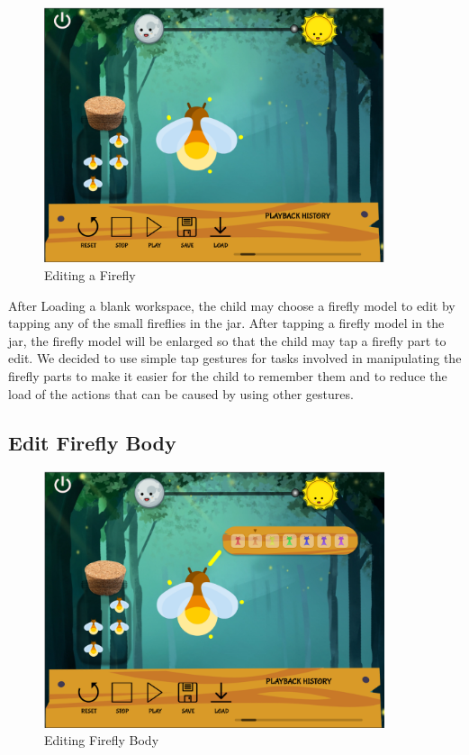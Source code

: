 \begin{figure}[H]
    \centering
    \includegraphics[width=10cm]{figures/ChooseFirefly.png}
    \caption{Editing a Firefly}
    \label{fig:editfirefly}
\end{figure}

After Loading a blank workspace, the child may choose a firefly model to edit by tapping any of the small fireflies in the jar. After tapping a firefly model in the jar, the firefly model will be enlarged so that the child may tap a firefly part to edit. We decided to use simple tap gestures for tasks involved in manipulating the firefly parts to make it easier for the child to remember them and to reduce the load of the actions that can be caused by using other gestures.  

\subsection{Edit Firefly Body}

\begin{figure}[H]
    \centering
    \includegraphics[width=10cm]{figures/Body.png}
    \caption{Editing Firefly Body}
    \label{fig:tweakBody}
\end{figure}

